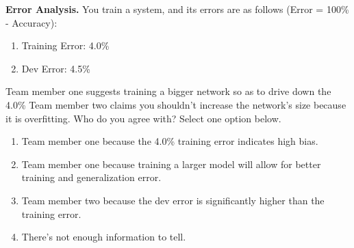 \item{}
\textbf{Error Analysis.}
You train a system, and its errors are as follows (Error = 100\% - Accuracy): 
\begin{enumerate}
    \item Training Error: 4.0\%
    \item Dev Error: 4.5\%
\end{enumerate}

Team member one suggests training a bigger network so as to drive down the 4.0\% Team member two claims you shouldn’t increase the network’s size because it is overfitting. Who do you agree with? Select one option below.

\begin{enumerate}[label=(\alph*)]
    \item Team member one because the 4.0\% training error indicates high bias.
    \item Team member one because training a larger model will allow for better training and generalization error.
    \item Team member two because the dev error is significantly higher than the training error.
    \item There’s not enough information to tell.
\end{enumerate} 
